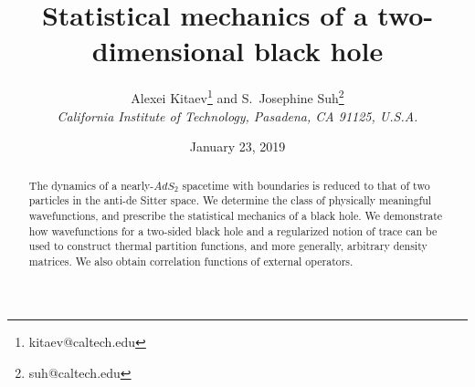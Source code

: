 \documentclass[12pt]{article}
\title {Statistical mechanics of a two-dimensional black hole}
\author{Alexei Kitaev\footnote{kitaev@caltech.edu}\; and
S.\ Josephine Suh\footnote{suh@caltech.edu}\\
\normalsize\it California Institute of Technology, Pasadena, CA 91125, U.S.A.\vspace{0.5cm}}
\date{January 23, 2019}
\DeclareMathOperator{\AdS}{AdS}
\def\AdS{AdS}
\begin{document}
\setcounter{tocdepth}{2}

\maketitle
\begin{abstract}
The dynamics of a nearly-$\AdS_2$ spacetime with boundaries is reduced to that of two particles in the anti-de Sitter space. We determine the class of physically meaningful wavefunctions, and prescribe the statistical mechanics of a black hole. We demonstrate how wavefunctions for a two-sided black hole and a regularized notion of trace can be used to construct thermal partition functions, and more generally, arbitrary density matrices. We also obtain correlation functions of external operators.
\end{abstract}

\tableofcontents
\newpage
\end{document}

